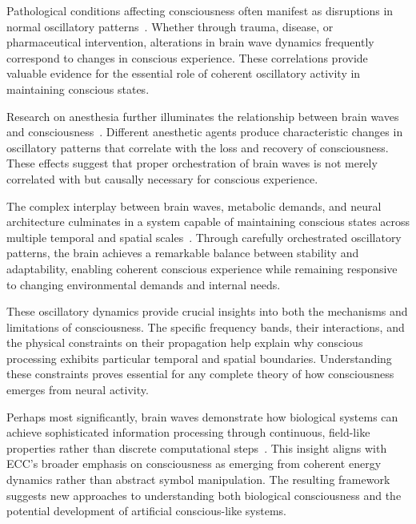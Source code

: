 Pathological conditions affecting consciousness often manifest as disruptions in normal oscillatory patterns~\cite{Uhlhaas2010, Basar2013}. Whether through trauma, disease, or pharmaceutical intervention, alterations in brain wave dynamics frequently correspond to changes in conscious experience. These correlations provide valuable evidence for the essential role of coherent oscillatory activity in maintaining conscious states.

Research on anesthesia further illuminates the relationship between brain waves and consciousness~\cite{Kahana2001, Steriade2006}. Different anesthetic agents produce characteristic changes in oscillatory patterns that correlate with the loss and recovery of consciousness. These effects suggest that proper orchestration of brain waves is not merely correlated with but causally necessary for conscious experience.

The complex interplay between brain waves, metabolic demands, and neural architecture culminates in a system capable of maintaining conscious states across multiple temporal and spatial scales~\cite{Varela2001, breakspear2005dynamics}. Through carefully orchestrated oscillatory patterns, the brain achieves a remarkable balance between stability and adaptability, enabling coherent conscious experience while remaining responsive to changing environmental demands and internal needs.

These oscillatory dynamics provide crucial insights into both the mechanisms and limitations of consciousness. The specific frequency bands, their interactions, and the physical constraints on their propagation help explain why conscious processing exhibits particular temporal and spatial boundaries. Understanding these constraints proves essential for any complete theory of how consciousness emerges from neural activity.

Perhaps most significantly, brain waves demonstrate how biological systems can achieve sophisticated information processing through continuous, field-like properties rather than discrete computational steps~\cite{Singer2018, Hameroff2014}. This insight aligns with ECC's broader emphasis on consciousness as emerging from coherent energy dynamics rather than abstract symbol manipulation. The resulting framework suggests new approaches to understanding both biological consciousness and the potential development of artificial conscious-like systems.

